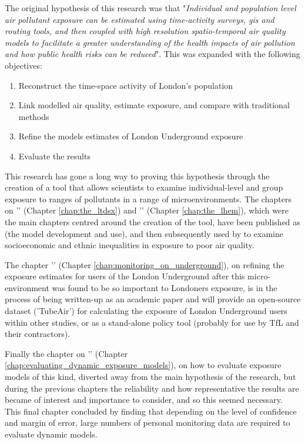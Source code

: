 The original hypothesis of this research was that "\textit{Individual and population level air pollutant exposure can be estimated using time-activity surveys, \gls{gis} and routing tools, and then coupled with high resolution spatio-temporal air quality models to facilitate a greater understanding of the health impacts of air pollution and how public health risks can be reduced}". This was expanded with the following objectives:

\begin{enumerate}
\item Reconstruct the time-space activity of London's population
\item Link modelled air quality, estimate exposure, and compare with traditional methods
\item Refine the models estimates of London Underground exposure
\item Evaluate the results
\end{enumerate}

This research has gone a long way to proving this hypothesis through the creation of a tool that allows scientists to examine individual-level and group exposure to ranges of pollutants in a range of microenvironments. The chapters on '' (Chapter \ref{chap:the_ltdsx}) and '' (Chapter \ref{chap:the_lhem}), which were the main chapters centred around the creation of the tool, have been published as \cite{Smith2016} (the model development and use), and then subsequently used by \cite{Tonne2018} to examine socioeconomic and ethnic inequalities in exposure to poor air quality.

The chapter '' (Chapter \ref{chap:monitoring_on_underground}), on refining the exposure estimates for users of the London Underground after this micro-environment was found to be so important to Londoners exposure, is in the process of being written-up as an academic paper and will provide an open-source dataset ('TubeAir') for calculating the exposure of London Underground users within other studies, or as a stand-alone policy tool (probably for use by TfL and their contractors).

Finally the chapter on '' (Chapter \ref{chap:evaluating_dynamic_exposure_models}), on how to evaluate exposure models of this kind, diverted away from the main hypothesis of the research, but during the previous chapters the reliability and how representative the results are became of interest and importance to consider, and so this seemed necessary. This final chapter concluded by finding that depending on the level of confidence and margin of error, large numbers of personal monitoring data are required to evaluate dynamic models.

